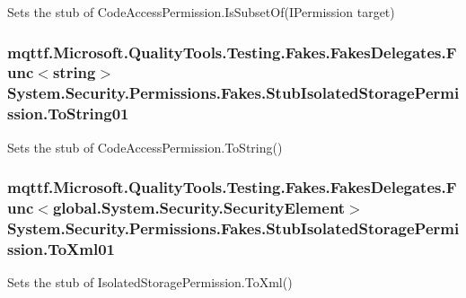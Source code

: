 Sets the stub of Code\-Access\-Permission.\-Is\-Subset\-Of(\-I\-Permission target)

\hypertarget{class_system_1_1_security_1_1_permissions_1_1_fakes_1_1_stub_isolated_storage_permission_a443c4a342dd9233a0ec67bd9e9fa6616}{
\subsubsection[{To\-String01}]{\setlength{\rightskip}{0pt plus 5cm}mqttf.\-Microsoft.\-Quality\-Tools.\-Testing.\-Fakes.\-Fakes\-Delegates.\-Func$<$string$>$ System.\-Security.\-Permissions.\-Fakes.\-Stub\-Isolated\-Storage\-Permission.\-To\-String01}}\label{class_system_1_1_security_1_1_permissions_1_1_fakes_1_1_stub_isolated_storage_permission_a443c4a342dd9233a0ec67bd9e9fa6616}


Sets the stub of Code\-Access\-Permission.\-To\-String()

\hypertarget{class_system_1_1_security_1_1_permissions_1_1_fakes_1_1_stub_isolated_storage_permission_a15057c20396f57d58dff68dddb16932b}{
\subsubsection[{To\-Xml01}]{\setlength{\rightskip}{0pt plus 5cm}mqttf.\-Microsoft.\-Quality\-Tools.\-Testing.\-Fakes.\-Fakes\-Delegates.\-Func$<$global.\-System.\-Security.\-Security\-Element$>$ System.\-Security.\-Permissions.\-Fakes.\-Stub\-Isolated\-Storage\-Permission.\-To\-Xml01}}\label{class_system_1_1_security_1_1_permissions_1_1_fakes_1_1_stub_isolated_storage_permission_a15057c20396f57d58dff68dddb16932b}


Sets the stub of Isolated\-Storage\-Permission.\-To\-Xml()

